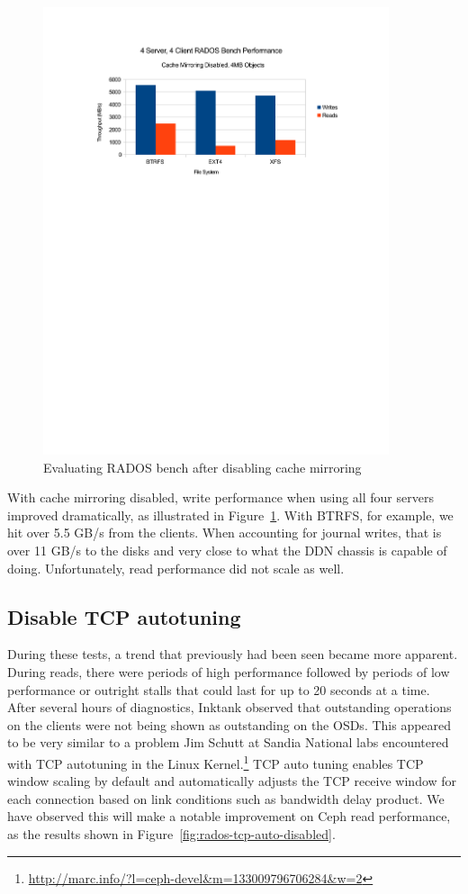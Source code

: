 \documentclass{article}
\begin{document}

\begin{figure}[htb]
\centering
\includegraphics[width=4in]{rados-after-ddn}
\caption{Evaluating RADOS bench after disabling cache mirroring}
\label{fig:rados-ddn-mirror-disabled}
\end{figure}


With cache mirroring disabled, write performance when using all four servers
improved dramatically, as illustrated in
Figure~\ref{fig:rados-ddn-mirror-disabled}. With BTRFS, for example, we hit over
5.5 GB/s from the clients.  When accounting for journal writes, that is over
11 GB/s to the disks and very close to what the DDN chassis is capable of doing. 
Unfortunately, read performance did not scale as well.


\subsection{Disable TCP autotuning}

During these tests, a trend that previously had been seen became more apparent.
During reads, there were periods of high performance followed by periods of low
performance or outright stalls that could last for up to 20 seconds at a time.
After several hours of diagnostics, Inktank observed that outstanding operations
on the clients were not being shown as outstanding on the OSDs.  This appeared
to be very similar to a problem Jim Schutt at Sandia National labs encountered
with TCP autotuning in the Linux Kernel.\footnote{\url{http://marc.info/?l=ceph-devel&m=133009796706284&w=2}}
TCP auto tuning enables TCP window scaling by default and automatically adjusts
the TCP receive window for each connection based on link conditions such as
bandwidth delay product. We have observed this will make a notable improvement
on Ceph read performance, as the results shown in
Figure~\ref{fig:rados-tcp-auto-disabled}.
\end{document}
